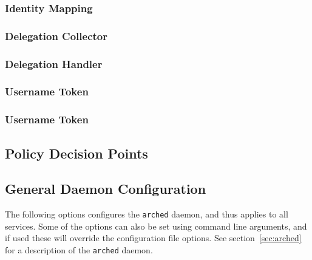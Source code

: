 \documentclass{article}
\begin{document}
\subsubsection{Identity Mapping}\label{sec:identitymap-shc}

\subsubsection{Delegation Collector}\label{sec:delegcollector-shc}
\subsubsection{Delegation Handler}\label{sec:deleghandler-shc}
\subsubsection{Username Token}\label{sec:unametoken-shc}
\subsubsection{Username Token}\label{sec:x509token-shc}

\subsection{Policy Decision Points}\label{sec:Policy Decision Points}

\subsection{General Daemon Configuration}\label{sec:General Daemon Configuration}
The following options configures the \texttt{arched} daemon, and thus applies to
all services. Some of the options can also be set using command line arguments,
and if used these will override the configuration file options. See
section~\ref{sec:arched} for a description of the \texttt{arched} daemon.
\end{document}
